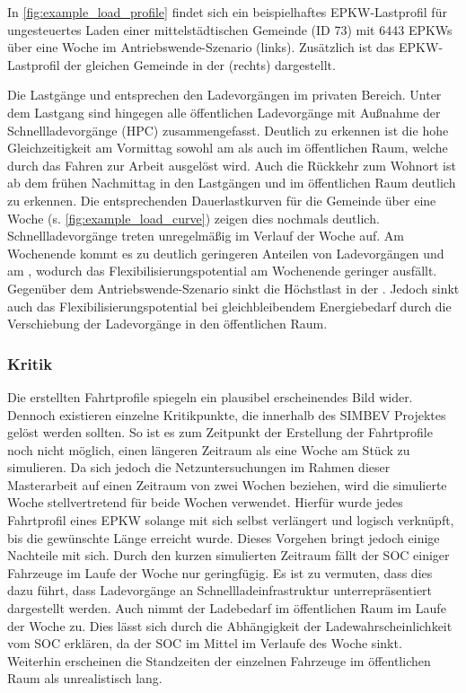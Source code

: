 

In \autoref{fig:example_load_profile} findet sich ein beispielhaftes \gls{EPKW}-Lastprofil für ungesteuertes Laden einer mittelstädtischen Gemeinde (\gls{ID} \num{73}) mit \num{6443} \glspl{EPKW} über eine Woche im Antriebswende-Szenario (links).
Zusätzlich ist das \gls{EPKW}-Lastprofil der gleichen Gemeinde in der \SzeFirmenparkplatz (rechts) dargestellt.



Die Lastgänge \zH und \Firmeparkplatz entsprechen den Ladevorgängen im privaten Bereich.
Unter dem Lastgang \oeffen sind hingegen alle öffentlichen Ladevorgänge mit Außnahme der Schnellladevorgänge (\gls{HPC}) zusammengefasst.
Deutlich zu erkennen ist die hohe Gleichzeitigkeit am Vormittag sowohl am \Firmeparkplatz als auch im öffentlichen Raum, welche durch das Fahren zur Arbeit ausgelöst wird.
Auch die Rückkehr zum Wohnort ist ab dem frühen Nachmittag in den Lastgängen \zH und im öffentlichen Raum deutlich zu erkennen. Die entsprechenden Dauerlastkurven für die Gemeinde über eine Woche (s. \autoref{fig:example_load_curve}) zeigen dies nochmals deutlich.
Schnellladevorgänge treten unregelmäßig im Verlauf der Woche auf.
Am Wochenende kommt es zu deutlich geringeren Anteilen von Ladevorgängen \zH und am \Firmeparkplatzdot, wodurch das Flexibilisierungspotential am Wochenende geringer ausfällt.
Gegenüber dem Antriebswende-Szenario sinkt die Höchstlast in der \SzeFirmenparkplatzdot.
Jedoch sinkt auch das Flexibilisierungspotential bei gleichbleibendem Energiebedarf durch die Verschiebung der Ladevorgänge in den öffentlichen Raum.




\subsubsection{Kritik}

Die erstellten Fahrtprofile spiegeln ein plausibel erscheinendes Bild wider.
Dennoch existieren einzelne Kritikpunkte, die innerhalb des \gls{SIMBEV} Projektes gelöst werden sollten.
So ist es zum Zeitpunkt der Erstellung der Fahrtprofile noch nicht möglich, einen längeren Zeitraum als eine Woche am Stück zu simulieren.
Da sich jedoch die Netzuntersuchungen im Rahmen dieser Masterarbeit auf einen Zeitraum von zwei Wochen beziehen, wird die simulierte Woche stellvertretend für beide Wochen verwendet.
Hierfür wurde jedes Fahrtprofil eines \gls{EPKW} solange mit sich selbst verlängert und logisch verknüpft, bis die gewünschte Länge erreicht wurde.
Dieses Vorgehen bringt jedoch einige Nachteile mit sich.
Durch den kurzen simulierten Zeitraum fällt der \gls{SOC} einiger Fahrzeuge im Laufe der Woche nur geringfügig.
Es ist zu vermuten, dass dies dazu führt, dass Ladevorgänge an Schnellladeinfrastruktur un­ter­re­prä­sen­tiert dargestellt werden.
Auch nimmt der Ladebedarf im öffentlichen Raum im Laufe der Woche zu.
Dies lässt sich durch die Abhängigkeit der Ladewahrscheinlichkeit vom \gls{SOC} erklären, da der \gls{SOC} im Mittel im Verlaufe des Woche sinkt.
Weiterhin erscheinen die Standzeiten der einzelnen Fahrzeuge im öffentlichen Raum als unrealistisch lang.



